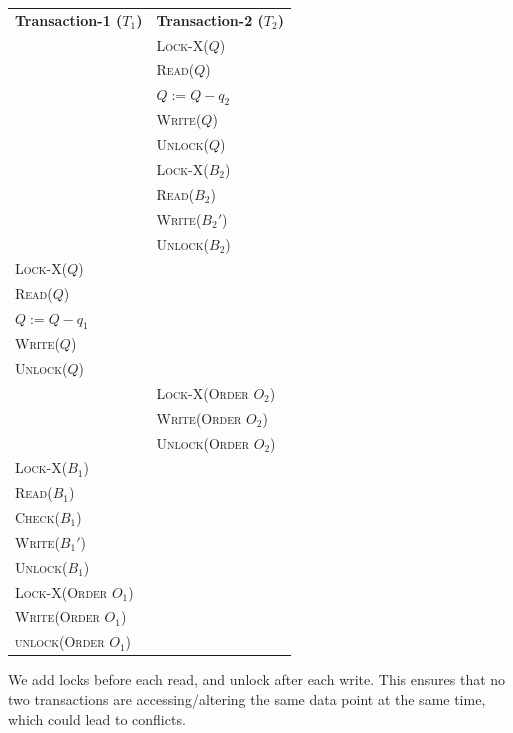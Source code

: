 \documentclass[12pt]{report}
\begin{document}
    \begin{center}
        \begin{adjustbox}{width=\textwidth}
            \begin{tabularx}{\textwidth}{|X|X|}
            \hline
            \multirow{2}{*}{\textbf{Transaction-1 ($T_{1}$)}} & \multirow{2}{*}{\textbf{Transaction-2 ($T_{2}$)}} \\
            & \\ \hline
            & \textsc{Lock-X($Q$)} \\
            & \textsc{Read($Q$)} \\
            & \textsc{$Q := Q - q_{2}$} \\
            & \textsc{Write($Q$)} \\
            & \textsc{Unlock($Q$)} \\
            & \textsc{Lock-X($B_{2}$)} \\
            & \textsc{Read($B_{2}$)} \\
            & \textsc{Write($B_{2}'$)} \\
            & \textsc{Unlock($B_{2}$)} \\
            \textsc{Lock-X($Q$)} & \\
            \textsc{Read($Q$)} & \\
            \textsc{$Q := Q - q_{1}$} & \\
            \textsc{Write($Q$)} & \\
            \textsc{Unlock($Q$)} & \\
            & \textsc{Lock-X(Order $O_{2}$)} \\
            & \textsc{Write(Order $O_{2}$)} \\
            & \textsc{Unlock(Order $O_{2}$)} \\
            \textsc{Lock-X($B_{1}$)} & \\
            \textsc{Read($B_{1}$)} & \\
            \textsc{Check($B_{1}$)} & \\
            \textsc{Write($B_{1}'$)} & \\
            \textsc{Unlock($B_{1}$)} & \\
            \textsc{Lock-X(Order $O_{1}$)} & \\
            \textsc{Write(Order $O_{1}$)} & \\
            \textsc{unlock(Order $O_{1}$)} & \\
            \hline
            \end{tabularx}
        \end{adjustbox}
    \end{center}
    \vspace*{10pt}
    We add locks before each read, and unlock after each write.
    This ensures that no two transactions are accessing/altering the same data point at the same time,
    which could lead to conflicts.
\end{document}
